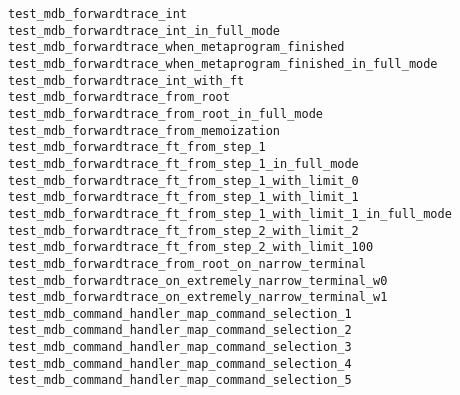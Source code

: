 \begin{description}
    \item[\texttt{test\_mdb\_forwardtrace\_int}]
    \item[\texttt{test\_mdb\_forwardtrace\_int\_in\_full\_mode}]
    \item[\texttt{test\_mdb\_forwardtrace\_when\_metaprogram\_finished}]
    \item[\texttt{test\_mdb\_forwardtrace\_when\_metaprogram\_finished\_in\_full\_mode}]
    \item[\texttt{test\_mdb\_forwardtrace\_int\_with\_ft}]
    \item[\texttt{test\_mdb\_forwardtrace\_from\_root}]
    \item[\texttt{test\_mdb\_forwardtrace\_from\_root\_in\_full\_mode}]
    \item[\texttt{test\_mdb\_forwardtrace\_from\_memoization}]
    \item[\texttt{test\_mdb\_forwardtrace\_ft\_from\_step\_1}]
    \item[\texttt{test\_mdb\_forwardtrace\_ft\_from\_step\_1\_in\_full\_mode}]
    \item[\texttt{test\_mdb\_forwardtrace\_ft\_from\_step\_1\_with\_limit\_0}]
    \item[\texttt{test\_mdb\_forwardtrace\_ft\_from\_step\_1\_with\_limit\_1}]
    \item[\texttt{test\_mdb\_forwardtrace\_ft\_from\_step\_1\_with\_limit\_1\_in\_full\_mode}]
    \item[\texttt{test\_mdb\_forwardtrace\_ft\_from\_step\_2\_with\_limit\_2}]
    \item[\texttt{test\_mdb\_forwardtrace\_ft\_from\_step\_2\_with\_limit\_100}]
    \item[\texttt{test\_mdb\_forwardtrace\_from\_root\_on\_narrow\_terminal}]
    \item[\texttt{test\_mdb\_forwardtrace\_on\_extremely\_narrow\_terminal\_w0}]
    \item[\texttt{test\_mdb\_forwardtrace\_on\_extremely\_narrow\_terminal\_w1}]
    \item[\texttt{test\_mdb\_command\_handler\_map\_command\_selection\_1}]
    \item[\texttt{test\_mdb\_command\_handler\_map\_command\_selection\_2}]
    \item[\texttt{test\_mdb\_command\_handler\_map\_command\_selection\_3}]
    \item[\texttt{test\_mdb\_command\_handler\_map\_command\_selection\_4}]
    \item[\texttt{test\_mdb\_command\_handler\_map\_command\_selection\_5}]

\end{description}
